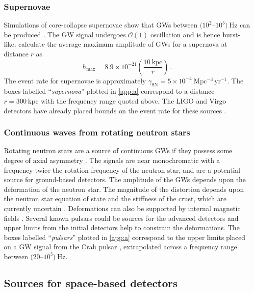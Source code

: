 \subsubsection{Supernovae}

Simulations of core-collapse supernovae show that GWs between $(10^{2}$--$10^{3})~\mathrm{Hz}$ can be produced \citep{Kotake2006}. The GW signal undergoes ${\mathcal{O}}(1)$ oscillation and is hence burst-like. \citet{2002A&A...393..523D} calculate the average maximum amplitude of GWs for a supernova at distance $r$ as
\begin{equation}
h_\mathrm{max} = 8.9\times 10^{-21}\left( \frac{10~\mathrm{kpc}}{r} \right) \; .
\end{equation}
The event rate for supernovae is approximately $\gamma_{\mathrm{SN}} = 5\times10^{-4}~\mathrm{Mpc^{-3}\,yr^{-1}}$. The boxes labelled ``\emph{supernova}'' plotted in \ref{app:a} correspond to a distance $r=300~\mathrm{kpc}$ with the frequency range quoted above. The LIGO and Virgo detectors have already placed bounds on the event rate for these sources \citep{Bursts}.

\subsubsection{Continuous waves from rotating neutron stars}

Rotating neutron stars are a source of continuous GWs if they possess some degree of axial asymmetry \citep{Abbott2007, Prix2009, Einstein@Home}. The signals are near monochromatic with a frequency twice the rotation frequency of the neutron star, and are a potential source for ground-based detectors. The amplitude of the GWs depends upon the deformation of the neutron star. The magnitude of the distortion depends upon the neutron star equation of state and the stiffness of the crust, which are currently uncertain \citep{Chamel2008,Lattimer2012}. Deformations can also be supported by internal magnetic fields \citep{Haskell2008}. Several known pulsars could be sources for the advanced detectors and upper limits from the initial detectors help to constrain the deformations. The boxes labelled ``\emph{pulsars}'' plotted in \ref{app:a} correspond to the upper limits placed on a GW signal from the Crab pulsar \citep{Aasi2014a}, extrapolated across a frequency range between $(20$--$10^{3})~\mathrm{Hz}$.

\subsection{Sources for space-based detectors}

